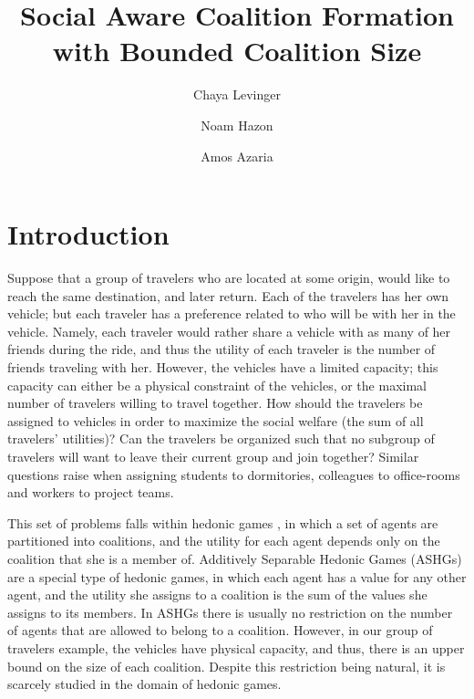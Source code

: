 \documentclass[sigconf,anonymous]{aamas}
\title[AAMAS-2023 Formatting Instructions]{Social Aware Coalition Formation with Bounded Coalition Size}
\author{Chaya Levinger}
\affiliation{Department of Computer Science, Ariel University, Ariel, Israel.}
\author{Noam Hazon}
\affiliation{Department of Computer Science, Ariel University, Ariel, Israel.}
\author{Amos Azaria}
\affiliation{Department of Computer Science, Ariel University, Ariel, Israel.}
\begin{document}

\pagestyle{fancy}
\fancyhead{}


\maketitle 

\section{Introduction}

Suppose that a group of travelers who are located at some origin, would like to reach the same destination, and later return. Each of the travelers has her own vehicle; but each traveler has a preference related to who will be with her in the vehicle. Namely, each traveler would rather share a vehicle with as many of her friends during the ride, and thus the utility of each traveler is the number of friends traveling with her. However, the vehicles have a limited capacity; this capacity can either be a physical constraint of the vehicles, or the maximal number of travelers willing to travel together. How should the travelers be assigned to vehicles in order to maximize the social welfare (the sum of all travelers' utilities)? Can the travelers be organized such that no subgroup of travelers will want to leave their current group and join together?
Similar questions raise when assigning students to dormitories, colleagues to office-rooms and workers to project teams.

This set of problems falls within hedonic games \cite{dreze1980hedonic}, in which a set of agents are partitioned into coalitions, and the utility for each agent depends only on the coalition that she is a member of.
Additively Separable Hedonic Games (ASHGs) \cite{bogomolnaia2002stability} are a special type of hedonic games, in which each agent has a value for any other agent, and the utility she assigns to a coalition is the sum of the values she assigns to its members. In ASHGs there is usually no restriction on the number of agents that are allowed to belong to a coalition. However, in our group of travelers example, the vehicles have physical capacity, and thus, there is an upper bound on the size of each coalition. Despite this restriction being natural, it is scarcely studied in the domain of hedonic games. 
\end{document}
